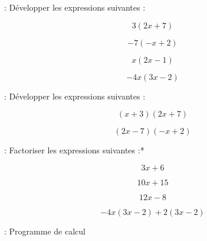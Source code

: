 : Développer les expressions suivantes :

\begin{multicols}{4}
    \noindent$$3(2x+7)$$
    \vspace*{10em}\columnbreak


    \noindent$$-7(-x+2)$$
    \vspace*{10em}\columnbreak

    \noindent$$x(2x-1)$$
    \vspace*{10em}\columnbreak

    \noindent$$-4x(3x-2)$$
    \vspace*{10em}\columnbreak
\end{multicols}

 : Développer les expressions suivantes :

\begin{multicols}{2}
    \noindent$$(x+3)(2x+7)$$
    \vspace*{10em}\columnbreak

    \noindent$$(2x-7)(-x+2)$$
    \vspace*{10em}\columnbreak
\end{multicols}

 : Factoriser les expressions suivantes :*

\begin{multicols}{4}
    \noindent$$3x+6$$
    \vspace*{5em}\columnbreak

    \noindent$$10x+15$$
    \vspace*{5em}\columnbreak

    \noindent$$12x-8$$
    \vspace*{5em}\columnbreak

    \noindent$$-4x(3x-2)+2(3x-2)$$
    \vspace*{5em}\columnbreak
\end{multicols}

\newpage

 : Programme de calcul

